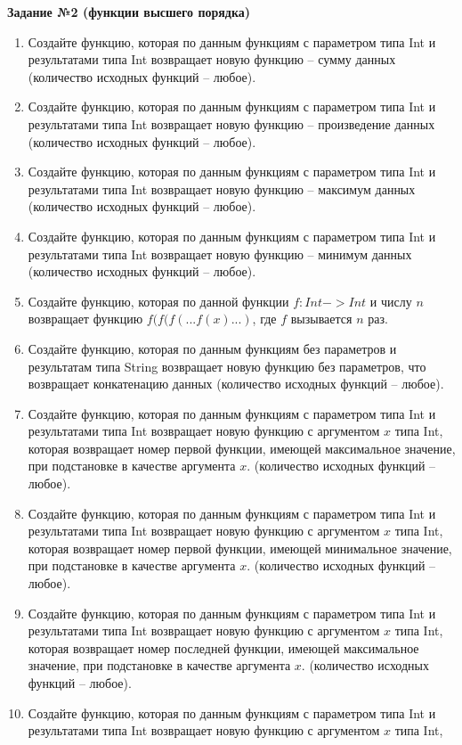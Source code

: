 \textbf{Задание №2 (функции высшего порядка)} 



\begin{enumerate}
	\item Создайте функцию, которая по данным функциям с параметром типа Int и результатами типа Int возвращает новую функцию -- сумму данных 
		(количество исходных функций -- любое).
	\item Создайте функцию, которая по данным функциям с параметром типа Int и результатами типа Int возвращает новую функцию -- произведение данных
		(количество исходных функций -- любое).
	\item Создайте функцию, которая по данным функциям с параметром типа Int и результатами типа Int возвращает новую функцию -- максимум данных
		(количество исходных функций -- любое).
  	\item Создайте функцию, которая по данным функциям с параметром типа Int и результатами типа Int возвращает новую функцию -- минимум данных
		(количество исходных функций -- любое).
	\item Создайте функцию, которая по данной функции $f:Int->Int$ и числу $n$ возвращает функцию $f(f(f(...f(x)...)$, где $f$ вызывается $n$ раз.
  	\item Создайте функцию, которая по данным функциям без параметров и результатам типа String возвращает новую функцию без параметров,
		что возвращает конкатенацию данных (количество исходных функций -- любое).
	\item Создайте функцию, которая по данным функциям с параметром типа Int и результатами типа Int возвращает новую функцию с аргументом $x$ типа Int,
		которая возвращает номер первой функции, имеющей максимальное значение, при подстановке в качестве аргумента $x$.
		(количество исходных функций -- любое).
	\item Создайте функцию, которая по данным функциям с параметром типа Int и результатами типа Int возвращает новую функцию с аргументом $x$ типа Int,
		которая возвращает номер первой функции, имеющей минимальное значение, при подстановке в качестве аргумента $x$.
		(количество исходных функций -- любое).
	\item Создайте функцию, которая по данным функциям с параметром типа Int и результатами типа Int возвращает новую функцию с аргументом $x$ типа Int,
		которая возвращает номер последней функции, имеющей максимальное значение, при подстановке в качестве аргумента $x$.
		(количество исходных функций -- любое).
	\item Создайте функцию, которая по данным функциям с параметром типа Int и результатами типа Int возвращает новую функцию с аргументом $x$ типа Int,

\end{enumerate}
